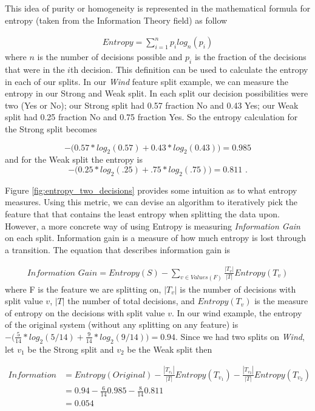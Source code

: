 This idea of purity or homogeneity is represented in the mathematical formula for entropy (taken from the Information Theory field) as follow

\begin{align}
Entropy = \sum_{i=1}^n p_i log_n(p_i)
\end{align}
where $n$ is the number of decisions possible and $p_i$ is the fraction of the decisions that were in the $i$th decision. This definition can be used to calculate the entropy in each of our splits. In our \textit{Wind} feature split example, we can measure the entropy in our Strong and Weak split. In each split our decision possibilities were two (Yes or No); our Strong split had 0.57 fraction No and 0.43 Yes; our Weak split had 0.25 fraction No and 0.75 fraction Yes. So the entropy calculation for the Strong split becomes

$$ - \Big(  0.57*log_2(0.57) + 0.43*log_2(0.43)  \Big) = 0.985$$
and for the Weak split the entropy is
$$ - \Big(  0.25*log_2(.25) + .75*log_2(.75)   \Big) = 0.811 \text{ .}$$

Figure \ref{fig:entropy_two_decisions} provides some intuition as to what entropy measures. Using this metric, we can devise an algorithm to iteratively pick the feature that that contains the least entropy when splitting the data upon. However, a more concrete way of using Entropy is measuring \textit{Information Gain} on each split. Information gain is a measure of how much entropy is lost through a transition. The equation that describes information gain is

\begin{align}
\textit{Information Gain} = Entropy(S) - \sum_{v\in Values(F)} \frac{|T_v|}{|T|}Entropy(T_v)
\end{align}
where F is the feature we are splitting on, $|T_v|$ is the number of decisions with split value $v$, $|T|$ the number of total decisions, and $Entropy(T_v)$ is the measure of entropy on the decisions with split value $v$. In our wind example, the entropy of the original system (without any splitting on any feature) is $-\big(\frac{5}{14}*log_2(5/14) + \frac{9}{14}*log_2(9/14) \big) =  0.94$. Since we had two splits on \textit{Wind}, let $v_1$ be the Strong split and $v_2$ be the Weak split then

\begin{align*}
  \textit{Information Gain(Wind)} &= Entropy(Original) - \frac{|T_{v_1}|}{|T|}Entropy(T_{v_1}) - \frac{|T_{v_2}|}{|T|}Entropy(T_{v_2}) \\
   &= 0.94 - \frac{6}{14}0.985 - \frac{8}{14}0.811 \\
   &= 0.054
\end{align*}

